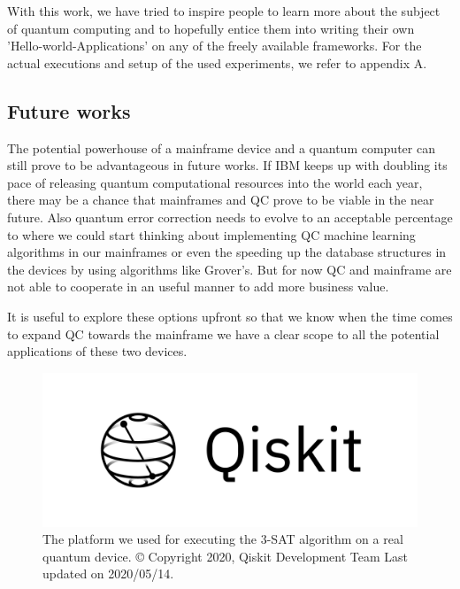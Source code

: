 With this work, we have tried to inspire people to learn more about the subject of quantum computing and to hopefully entice them into writing their own 'Hello-world-Applications' on any of the freely available frameworks. For the actual executions and setup of the used experiments, we refer to appendix A.

\subsection{Future works}

The potential powerhouse of a mainframe device and a quantum computer can still prove to be advantageous in future works. If IBM keeps up with doubling its pace of releasing quantum computational resources into the world each year, there may be a chance that mainframes and QC prove to be viable in the near future. Also quantum error correction needs to evolve to an acceptable percentage to where we could start thinking about implementing QC machine learning algorithms in our mainframes or even the speeding up the database structures in the devices by using algorithms like Grover's. But for now QC and mainframe are not able to cooperate in an useful manner to add more business value. 

It is useful to explore these options upfront so that we know when the time comes to expand QC towards the mainframe we have a clear scope to all the potential applications of these two devices.


\begin{figure}[h]
	\centering
	\includegraphics[scale = 0.75]{../Demonstration/img/qiskit_logo.PNG}
	\caption{The platform we used for executing the 3-SAT algorithm on a real quantum device. © Copyright 2020, Qiskit Development Team Last updated on 2020/05/14.}
\end{figure}



